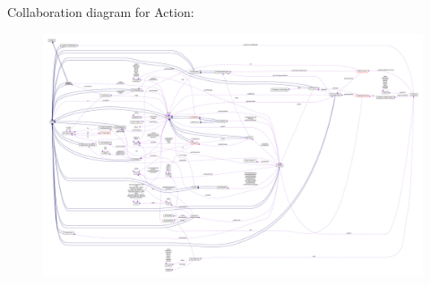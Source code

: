 Collaboration diagram for Action\+:
\nopagebreak
\begin{figure}[H]
\begin{center}
\leavevmode
\includegraphics[width=350pt]{classAction__coll__graph}
\end{center}
\end{figure}
